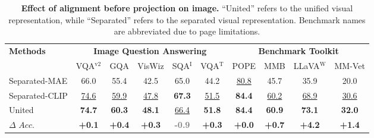 \begin{table*}[t]
  \setlength\tabcolsep{0.55mm}
  \caption{\textbf{Effect of alignment before projection on image.} ``\textcolor[rgb]{0.12,0.47,0.71}{United}'' refers to the unified visual representation, while ``\textcolor[rgb]{1.0,0.5,0.05}{Separated}'' refers to the separated visual representation. Benchmark names are abbreviated due to page limitations.}
  \label{tab:uvr_fig}
  \centering
  \begin{tabular}{l|ccccc|cccc}
    \toprule
     \multirow{2}{*}{\textbf{Methods}} & \multicolumn{5}{c|}{\textbf{Image Question Answering}} & \multicolumn{4}{c}{\textbf{Benchmark Toolkit}} \\
     & VQA$^\text{v2}$ & GQA & VisWiz & SQA$^\text{I}$ & VQA$^\text{T}$ & POPE & MMB & LLaVA$^\text{W}$ & MM-Vet \\
    \midrule
    \textcolor[rgb]{1.0,0.5,0.05}{Separated}-MAE & 66.0 & 55.4 & 42.5 & 65.0 & 44.2 & \underline{80.8} & 45.7 & 35.9 & 20.0 \\
    \textcolor[rgb]{1.0,0.5,0.05}{Separated}-CLIP & \underline{74.6} & \underline{59.9} & \underline{47.8} & \textbf{67.3} & \underline{51.5} & \textbf{84.4} & \underline{60.2} & \underline{68.9} & \underline{30.6} \\
    \textcolor[rgb]{0.12,0.47,0.71}{United} & \textbf{74.7} & \textbf{60.3} & \textbf{48.1} & \underline{66.4} & \textbf{51.8} & \textbf{84.4} & \textbf{60.9} & \textbf{73.1} & \textbf{32.0} \\
     $\Delta$ \textcolor{sgreen}{$Acc.$} & \textcolor{sgreen}{{\textbf{+0.1}}} & \textcolor{sgreen}{{\textbf{+0.4}}} &\textcolor{sgreen}{{\textbf{+0.3}}} &\textcolor{gray}{{\textbf{-0.9}}} &\textcolor{sgreen}{{\textbf{+0.3}}} &\textcolor{sgreen}{{\textbf{+0.0}}} &\textcolor{sgreen}{{\textbf{+0.7}}} &\textcolor{sgreen}{{\textbf{+4.2}}} &\textcolor{sgreen}{{\textbf{+1.4}}} \\
    \bottomrule
  \end{tabular}
\end{table*}

